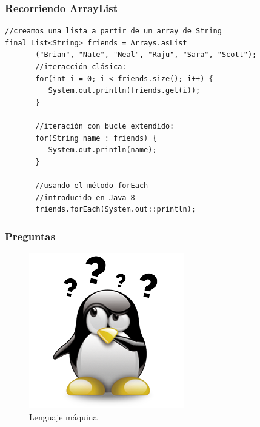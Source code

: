 \documentclass{beamer}
\begin{document}
\begin{frame}[fragile]
\frametitle{Recorriendo ArrayList}
\begin{verbatim}
//creamos una lista a partir de un array de String
final List<String> friends = Arrays.asList
       ("Brian", "Nate", "Neal", "Raju", "Sara", "Scott");
       //iteracción clásica:
       for(int i = 0; i < friends.size(); i++) {
          System.out.println(friends.get(i));
       }

       //iteración con bucle extendido:
       for(String name : friends) {
          System.out.println(name);
       }

       //usando el método forEach
       //introducido en Java 8
       friends.forEach(System.out::println);
\end{verbatim}
\end{frame}

\begin{frame}
\frametitle{Preguntas} 
\begin{figure}
\includegraphics[scale=0.9]{imagenes/dudas.png} 
\caption{Lenguaje máquina}
\end{figure} 
\end{frame}
\end{document}
